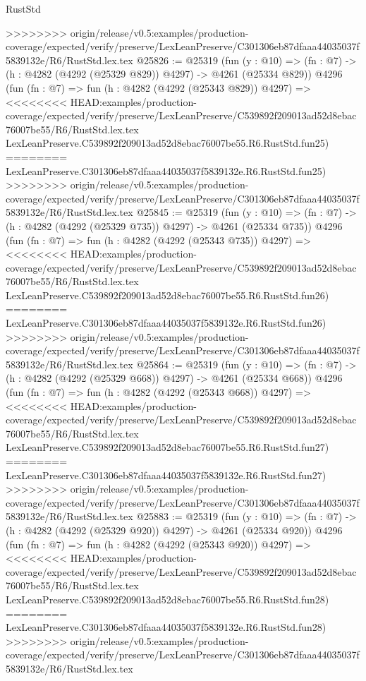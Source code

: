 \begin{lexlean}{RustStd}
\begin{coremodule}
{\begin{coremodule}
{{{{{{{{{{{{{{{{{{{{{{{{{{{{{{{{{{{>>>>>>>> origin/release/v0.5:examples/production-coverage/expected/verify/preserve/LexLeanPreserve/C301306eb87dfaaa44035037f5839132e/R6/RustStd.lex.tex
@25826 := @25319
    (fun (y : @10) => (fn : @7) -> (h : @4282 (@4292 (@25329 @829)) @4297) -> @4261 (@25334 @829))
    @4296
    (fun (fn : @7) =>
    fun (h : @4282 (@4292 (@25343 @829)) @4297) =>
<<<<<<<< HEAD:examples/production-coverage/expected/verify/preserve/LexLeanPreserve/C539892f209013ad52d8ebac76007be55/R6/RustStd.lex.tex
    LexLeanPreserve.C539892f209013ad52d8ebac76007be55.R6.RustStd.fun25)
========
    LexLeanPreserve.C301306eb87dfaaa44035037f5839132e.R6.RustStd.fun25)
>>>>>>>> origin/release/v0.5:examples/production-coverage/expected/verify/preserve/LexLeanPreserve/C301306eb87dfaaa44035037f5839132e/R6/RustStd.lex.tex
@25845 := @25319
    (fun (y : @10) => (fn : @7) -> (h : @4282 (@4292 (@25329 @735)) @4297) -> @4261 (@25334 @735))
    @4296
    (fun (fn : @7) =>
    fun (h : @4282 (@4292 (@25343 @735)) @4297) =>
<<<<<<<< HEAD:examples/production-coverage/expected/verify/preserve/LexLeanPreserve/C539892f209013ad52d8ebac76007be55/R6/RustStd.lex.tex
    LexLeanPreserve.C539892f209013ad52d8ebac76007be55.R6.RustStd.fun26)
========
    LexLeanPreserve.C301306eb87dfaaa44035037f5839132e.R6.RustStd.fun26)
>>>>>>>> origin/release/v0.5:examples/production-coverage/expected/verify/preserve/LexLeanPreserve/C301306eb87dfaaa44035037f5839132e/R6/RustStd.lex.tex
@25864 := @25319
    (fun (y : @10) => (fn : @7) -> (h : @4282 (@4292 (@25329 @668)) @4297) -> @4261 (@25334 @668))
    @4296
    (fun (fn : @7) =>
    fun (h : @4282 (@4292 (@25343 @668)) @4297) =>
<<<<<<<< HEAD:examples/production-coverage/expected/verify/preserve/LexLeanPreserve/C539892f209013ad52d8ebac76007be55/R6/RustStd.lex.tex
    LexLeanPreserve.C539892f209013ad52d8ebac76007be55.R6.RustStd.fun27)
========
    LexLeanPreserve.C301306eb87dfaaa44035037f5839132e.R6.RustStd.fun27)
>>>>>>>> origin/release/v0.5:examples/production-coverage/expected/verify/preserve/LexLeanPreserve/C301306eb87dfaaa44035037f5839132e/R6/RustStd.lex.tex
@25883 := @25319
    (fun (y : @10) => (fn : @7) -> (h : @4282 (@4292 (@25329 @920)) @4297) -> @4261 (@25334 @920))
    @4296
    (fun (fn : @7) =>
    fun (h : @4282 (@4292 (@25343 @920)) @4297) =>
<<<<<<<< HEAD:examples/production-coverage/expected/verify/preserve/LexLeanPreserve/C539892f209013ad52d8ebac76007be55/R6/RustStd.lex.tex
    LexLeanPreserve.C539892f209013ad52d8ebac76007be55.R6.RustStd.fun28)
========
    LexLeanPreserve.C301306eb87dfaaa44035037f5839132e.R6.RustStd.fun28)
>>>>>>>> origin/release/v0.5:examples/production-coverage/expected/verify/preserve/LexLeanPreserve/C301306eb87dfaaa44035037f5839132e/R6/RustStd.lex.tex
}}}}}}}}}}}}}}}}}}}}}}}}}}}}}}}}}}}
\end{coremodule}}
\end{coremodule}
\end{lexlean}
